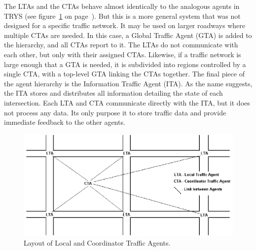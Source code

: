 \documentclass[11pt,letterpaper,onecolumn,twoside,openright,draft]{report}
\begin{document}
The LTAs and the CTAs behave almost identically to the analogous agents in TRYS (see figure~\ref{fig:LTAs-and-CTA} on page~\pageref{fig:LTAs-and-CTA}).
But this is a more general system that was not designed for a specific traffic network.
It may be used on larger roadways where multiple CTAs are needed.
In this case, a Global Traffic Agent (GTA) is added to the hierarchy, and all CTAs report to it.
The LTAs do not communicate with each other, but only with their assigned CTAs.
Likewise, if a traffic network is large enough that a GTA is needed, it is subdivided into regions controlled by a single CTA, with a top-level GTA linking the CTAs together.
The final piece of the agent hierarchy is the Information Traffic Agent (ITA).
As the name suggests, the ITA stores and distributes all information detailing the state of each intersection.
Each LTA and CTA communicate directly with the ITA, but it does not process any data.
Its only purpose it to store traffic data and provide immediate feedback to the other agents.

\begin{figure}[h]
  \includegraphics{figures/LTAs-and-CTA.PNG}
  \caption{Layout of Local and Coordinator Traffic Agents.}
  \label{fig:LTAs-and-CTA}
\end{figure}

\end{document}
